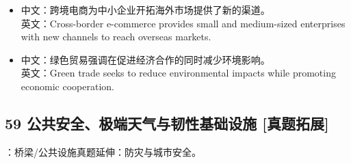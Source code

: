 \documentclass[a4paper,11pt,UTF8,fontset=none]{ctexart}
\begin{document}
\par

\begin{itemize}[leftmargin=1.7em,itemsep=1pt,parsep=0pt,topsep=2pt]
\item \noindent 中文：跨境电商为中小企业开拓海外市场提供了新的渠道。\\ 英文：Cross-border e-commerce provides small and medium-sized enterprises with new channels to reach overseas markets.\par


\item \noindent 中文：绿色贸易强调在促进经济合作的同时减少环境影响。\\ 英文：Green trade seeks to reduce environmental impacts while promoting economic cooperation.\par


\end{itemize}

\subsection{59 公共安全、极端天气与韧性基础设施 {\color{AccentBlue} [真题拓展]}}

\begin{tcolorbox}[enhanced,breakable,boxrule=0.35pt,colback=VeryPaleBlue,colframe=AccentBlue!40,left=7pt,right=7pt,top=4pt,bottom=4pt,borderline west={2pt}{0pt}{AccentBlue},before skip=4pt,after skip=6pt]
：桥梁/公共设施真题延伸：防灾与城市安全。\par


\end{tcolorbox}
\end{document}
